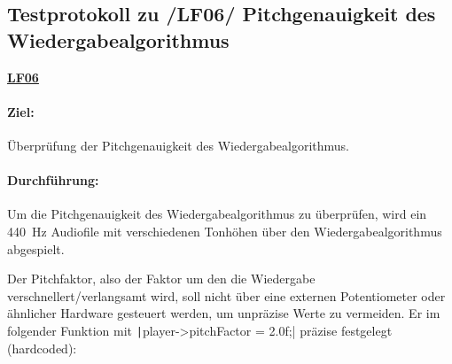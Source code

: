 \newpage
\subsection{Testprotokoll zu /LF06/ Pitchgenauigkeit des Wiedergabealgorithmus}
\label{test-pitchgenauigkeit}

\textbf{\hyperlink{lf-pitchaudio}{LF06}}

\paragraph{Ziel:}
Überprüfung der Pitchgenauigkeit des Wiedergabealgorithmus.

\paragraph{Durchführung:}

Um die Pitchgenauigkeit des Wiedergabealgorithmus zu überprüfen, wird ein \SI{440}{\hertz} Audiofile mit verschiedenen Tonhöhen über den Wiedergabealgorithmus abgespielt.

Der Pitchfaktor, also der Faktor um den die Wiedergabe verschnellert/verlangsamt wird, soll nicht über eine externen Potentiometer oder ähnlicher Hardware gesteuert werden, um unpräzise Werte zu vermeiden.
Er im folgender Funktion mit \texttt|player->pitchFactor = 2.0f;| präzise festgelegt (hardcoded):

\inputminted[firstline=15, lastline=23]{c}{../../f401_sd_card_audio_codec_test/Core/Src/wavPlayer.c}

